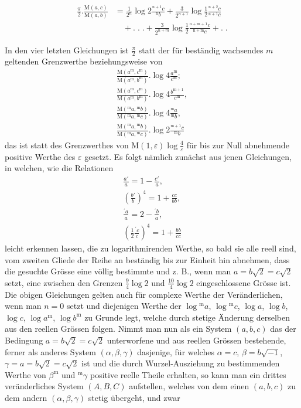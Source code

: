 \[
\begin{aligned}\displaystyle\frac\pi2.\frac{\mathrm{M}(a,c)}{\mathrm{M}(a,b)}&\displaystyle=\frac1{2^n}\log2\frac{{}^{\mathrm{n}+1}c}{{}^{\mathrm{n}}b}+\frac3{2^{n+1}}\log\frac12\frac{{}^{\mathrm{n}+2}c}{{}^{\mathrm{n}+1}c}\\&\quad+.\;.\;.+\frac3{2^{n+m}}\log\frac12\frac{{}^{\mathrm{n}+\mathrm{m}+1}c}{{}^{\mathrm{n}+\mathrm{m}}c}+.\;.\end{aligned}
\]
\par In den vier letzten Gleichungen ist $\frac\pi2$ statt der für beständig wachsendes $m$ geltenden Grenzwerthe beziehungsweise von
\[
\begin{gathered}\frac{\mathrm{M}(a^{\mathrm{m}},c^{\mathrm{m}})}{\mathrm{M}(a^{\mathrm{m}},b^{\mathrm{m}})}.\log4\frac{a^{\mathrm{m}}}{c^{\mathrm{m}}};\\[9pt]
\frac{\mathrm{M}(a^{\mathrm{m}},c^{\mathrm{m}})}{\mathrm{M}(a^{\mathrm{m}},b^{\mathrm{m}})}.\log4\frac{b^{\mathrm{m}+1}}{c^{\mathrm{m}}},\\[9pt]
\frac{\mathrm{M}({}^{\mathrm{m}}a,{}^{\mathrm{m}}b)}{\mathrm{M}({}^{\mathrm{m}}a,{}^{\mathrm{m}}c)}.\log4\frac{{}^{\mathrm{m}}a}{{}^{\mathrm{m}}b},\\[9pt]
\frac{\mathrm{M}({}^{\mathrm{m}}a,{}^{\mathrm{m}}b)}{\mathrm{M}({}^{\mathrm{m}}a,{}^{\mathrm{m}}c)}.\log2\frac{{}^{\mathrm{m}+1}c}{{}^{\mathrm{m}}b}\end{gathered}
\]
das ist statt des Grenzwerthes von $\mathrm{M}(1,\varepsilon)\log\frac4\varepsilon$ für bis zur Null abnehmende positive Werthe des $\varepsilon$ gesetzt. Es folgt nämlich zunächst aus jenen Gleichungen, in welchen, wie die Relationen
\[
\begin{gathered}\frac{a'}a=1-\frac{c'}a,\\[7pt]
\left(\frac{b'}b\right)^4=1+\frac{cc}{bb},\\[7pt]
\frac{{}^\prime a}a=2-\frac{{}^\prime b}a,\\[7pt]
\left(\frac12\frac{{}^\prime c}c\right)^4=1+\frac{bb}{cc}\end{gathered}
\]
leicht erkennen lassen, die zu logarithmirenden Werthe, so bald sie alle reell sind, vom zweiten Gliede der Reihe an beständig bis zur Einheit hin abnehmen, dass die gesuchte Grösse eine völlig bestimmte und z. B., wenn man $a=b\surd2=c\surd2$ setzt, eine zwischen den Grenzen $\frac94\log2$ und $\frac{10}4\log2$ eingeschlossene Grösse ist. Die obigen Gleichungen gelten auch für complexe Werthe der Veränderlichen, wenn man $n=0$ setzt und diejenigen Werthe der $\log{}^{\mathrm{m}}a$, $\log{}^{\mathrm{m}}c$, $\log a$, $\log b$, $\log c$, $\log a^{\mathrm{m}}$, $\log b^{\mathrm{m}}$ zu Grunde legt, welche durch stetige Änderung derselben aus den reellen Grössen folgen. Nimmt man nun als ein System $(a,b,c)$ das der Bedingung $a=b\surd2=c\surd2$ unterworfene und aus reellen Grössen bestehende, ferner als anderes System $(\alpha,\beta,\gamma)$ dasjenige, für welches $\alpha=c$, $\beta=b\surd{-1}$, $\gamma=a=b\surd2=c\surd2$ ist und die durch Wurzel-Ausziehung zu bestimmenden Werthe von $\beta^{\mathrm{m}}$ und ${}^{\mathrm{m}}\gamma$ positive reelle Theile erhalten, so kann man ein drittes veränderliches System $(A,B,C)$ aufstellen, welches von dem einen $(a,b,c)$ zu dem andern $(\alpha,\beta,\gamma)$ stetig übergeht, und zwar
